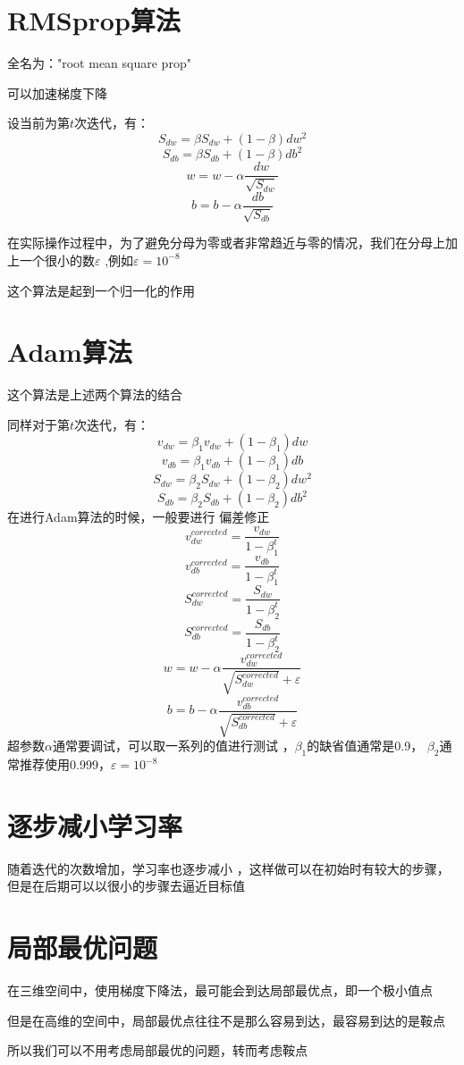 \documentclass[UTF8]{ctexrep}
\begin{document}
\section{RMSprop算法}
全名为："root mean square prop"

可以加速梯度下降

设当前为第$t$次迭代，有：
$$S_{dw}=\beta S_{dw}+(1-\beta)dw^2$$
$$S_{db}=\beta S_{db}+(1-\beta)db^2$$
$$w=w-\alpha\frac{dw}{\sqrt{S_{dw}}}$$
$$b=b-\alpha\frac{db}{\sqrt{S_{db}}}$$

在实际操作过程中，为了避免分母为零或者非常趋近与零的情况，我们在分母上加上一个很小的数$\varepsilon$
,例如$\varepsilon = 10^{-8}$

这个算法是起到一个归一化的作用

\section{Adam算法}
这个算法是上述两个算法的结合

同样对于第$t$次迭代，有：
$$v_{dw}=\beta_1 v_{dw}+(1-\beta_1)dw$$
$$v_{db}=\beta_1 v_{db}+(1-\beta_1)db$$
$$S_{dw}=\beta_2 S_{dw}+(1-\beta_2)dw^2$$
$$S_{db}=\beta_2 S_{db}+(1-\beta_2)db^2$$
在进行Adam算法的时候，一般要进行 偏差修正 
$$v_{dw}^{corrected}=\frac{v_{dw}}{1-\beta_1^t}$$
$$v_{db}^{corrected}=\frac{v_{db}}{1-\beta_1^t}$$
$$S_{dw}^{corrected}=\frac{S_{dw}}{1-\beta_2^t}$$
$$S_{db}^{corrected}=\frac{S_{db}}{1-\beta_2^t}$$
$$w=w-\alpha\frac{v_{dw}^{corrected}}{\sqrt{S_{dw}^{corrected}}+\varepsilon}$$
$$b=b-\alpha\frac{v_{db}^{corrected}}{\sqrt{S_{db}^{corrected}}+\varepsilon}$$
超参数$\alpha$通常要调试，可以取一系列的值进行测试
，$\beta_1$的缺省值通常是0.9， $\beta_2$通常推荐使用0.999，$\varepsilon = 10^{-8}$

\section{逐步减小学习率}
随着迭代的次数增加，学习率也逐步减小
，这样做可以在初始时有较大的步骤，但是在后期可以以很小的步骤去逼近目标值

\section{局部最优问题}
在三维空间中，使用梯度下降法，最可能会到达局部最优点，即一个极小值点

但是在高维的空间中，局部最优点往往不是那么容易到达，最容易到达的是鞍点

所以我们可以不用考虑局部最优的问题，转而考虑鞍点
\end{document}
